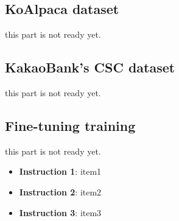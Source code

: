 \documentclass[sigconf]{acmart}
\begin{document}


\subsection{KoAlpaca dataset}
this part is not ready yet.




\subsection{KakaoBank's CSC dataset}
this part is not ready yet.






\subsection{Fine-tuning training}
this part is not ready yet.




\begin{itemize}
  \item {\bf Instruction 1}: item1
  \item {\bf Instruction 2}: item2
  \item {\bf Instruction 3}: item3\\
\end{itemize}
\end{document}
